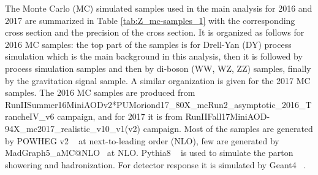 The Monte Carlo (MC) simulated samples used in the main analysis for 2016 and 2017 are summarized in Table \ref{tab:Z_mc-samples_1} with the corresponding cross section and the precision of the cross section. It is organized as follows for 2016 MC samples: the top part of the samples is for Drell-Yan (DY) process simulation which is the main background in this analysis, then it is followed by \ttbar process simulation samples and then by di-boson (WW, WZ, ZZ) samples, finally by the gravitation signal sample. A similar organization is given for the 2017 MC samples. The 2016 MC samples are produced from RunIISummer16MiniAODv2*PUMoriond17\_80X\_mcRun2\_asymptotic\_2016\_TrancheIV\_v6 campaign, and for 2017 it is from RunIIFall17MiniAOD-94X\_mc2017\_realistic\_v10\_v1(v2) campaign.
Most of the samples are generated by POWHEG v2 ~\cite{Nason:2004rx,Frixione:2007vw,Alioli:2010xd,Alioli:2008gx,Frixione:2007nw,Re:2010bp} at next-to-leading order (NLO), few are generated by MadGraph5\_aMC@NLO~\cite{MadGraph5} at NLO. Pythia8 ~\cite{Sjostrand:2014zea} is used to simulate the parton showering and hadronization. For detector response it is simulated by Geant4 ~\cite{Agostinelli:2002hh}.


